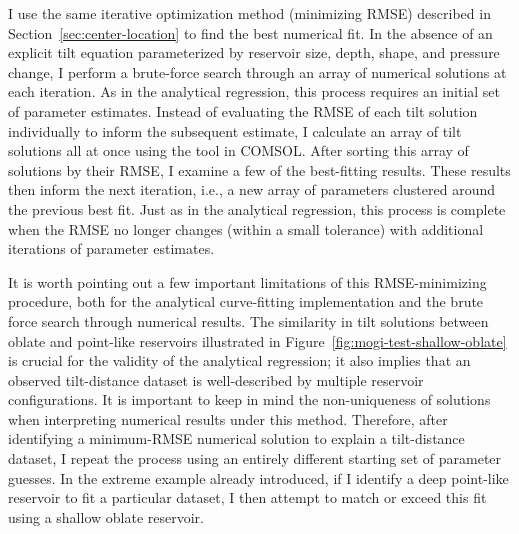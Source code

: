 I use the same iterative optimization method (minimizing \acs{RMSE}) described in Section~\ref{sec:center-location} to find the best numerical fit. In the absence of an explicit tilt equation parameterized by reservoir size, depth, shape, and pressure change, I perform a brute-force search through an array of numerical solutions at each iteration. As in the analytical regression, this process requires an initial set of parameter estimates. Instead of evaluating the \acs{RMSE} of each tilt solution individually to inform the subsequent estimate, I calculate an array of tilt solutions all at once using the  tool in COMSOL. After sorting this array of solutions by their \acs{RMSE}, I examine a few of the best-fitting results. These results then inform the next iteration, i.e., a new array of parameters clustered around the previous best fit. Just as in the analytical regression, this process is complete when the \acs{RMSE} no longer changes (within a small tolerance) with additional iterations of parameter estimates.

It is worth pointing out a few important limitations of this \acs{RMSE}-minimizing procedure, both for the analytical curve-fitting implementation and the brute force search through numerical results. The similarity in tilt solutions between oblate and point-like reservoirs illustrated in Figure~\ref{fig:mogi-test-shallow-oblate} is crucial for the validity of the analytical regression; it also implies that an observed tilt-distance dataset is well-described by multiple reservoir configurations. It is important to keep in mind the non-uniqueness of solutions when interpreting numerical results under this method. Therefore, after identifying a minimum-\acs{RMSE} numerical solution to explain a tilt-distance dataset, I repeat the process using an entirely different starting set of parameter guesses. In the extreme example already introduced, if I identify a deep point-like reservoir to fit a particular dataset, I then attempt to match or exceed this fit using a shallow oblate reservoir.